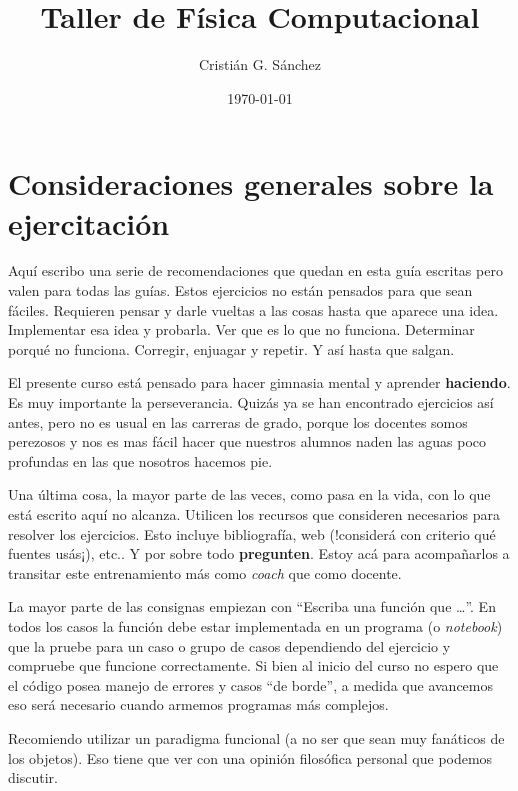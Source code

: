 \documentclass[a4paper,12pt]{article}
\begin{document}
\title{Taller de Física Computacional}

\author{Cristián G. Sánchez}

\date{\today}

\maketitle

\section*{Consideraciones generales sobre la ejercitación}

Aquí escribo una serie de recomendaciones que quedan en esta guía escritas pero valen para todas las guías. Estos ejercicios no están pensados para que sean fáciles. Requieren pensar y darle vueltas a las cosas hasta que aparece una idea. Implementar esa idea y probarla. Ver que es lo que no funciona. Determinar porqué no funciona. Corregir, enjuagar y repetir. Y así hasta que salgan.

El presente curso está pensado para hacer gimnasia mental y aprender {\bf haciendo}. Es muy importante la perseverancia. Quizás ya se han encontrado ejercicios así antes, pero no es usual en las carreras de grado, porque los docentes somos perezosos y nos es mas fácil hacer que nuestros alumnos naden las aguas poco profundas en las que nosotros hacemos pie. 

Una última cosa, la mayor parte de las veces, como pasa en la vida, con lo que está escrito aquí no alcanza. Utilicen los recursos que consideren necesarios para resolver los ejercicios. Esto incluye bibliografía, web (!considerá con criterio qué fuentes usás¡), etc.. Y por sobre todo {\bf pregunten}. Estoy acá para acompañarlos a transitar este entrenamiento más como {\em coach} que como docente.

La mayor parte de las consignas empiezan con ``Escriba una función que \ldots ''. En todos los casos la función debe estar implementada en un programa (o {\em notebook}) que la pruebe para un caso o grupo de casos dependiendo del ejercicio y compruebe que funcione correctamente. Si bien al inicio del curso no espero que el código posea manejo de errores y casos ``de borde'', a medida que avancemos eso será necesario cuando armemos programas más complejos.

Recomiendo utilizar un paradigma funcional (a no ser que sean muy fanáticos de los objetos). Eso tiene que ver con una opinión filosófica personal que podemos discutir.
\end{document}

